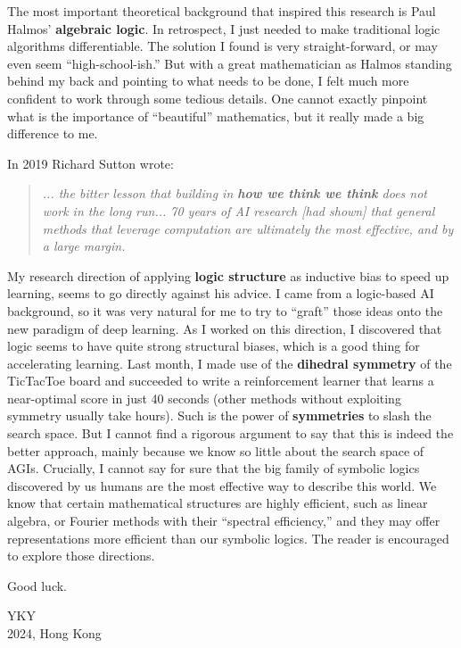 \begin{preface}
The most important theoretical background that inspired this research is Paul Halmos' \textbf{algebraic logic}.  In retrospect, I just needed to make traditional logic algorithms differentiable.  The solution I found is very straight-forward, or may even seem ``high-school-ish.''  But with a great mathematician as Halmos standing behind my back and pointing to what needs to be done, I felt much more confident to work through some tedious details.  One cannot exactly pinpoint what is the importance of ``beautiful'' mathematics, but it really made a big difference to me.

In 2019 Richard Sutton wrote:
\begin{quotation}
	\textit{... the bitter lesson that building in \textbf{how we think we think} does not work in the long run... 70 years of AI research [had shown] that general methods that leverage computation are ultimately the most effective, and by a large margin.}
\end{quotation}
My research direction of applying \textbf{logic structure} as inductive bias to speed up learning, seems to go directly against his advice.  I came from a logic-based AI background, so it was very natural for me to try to ``graft'' those ideas onto the new paradigm of deep learning.  As I worked on this direction, I discovered that logic seems to have quite strong structural biases, which is a good thing for accelerating learning.  Last month, I made use of the \textbf{dihedral symmetry} of the TicTacToe board and succeeded to write a reinforcement learner that learns a near-optimal score in just 40 seconds (other methods without exploiting symmetry usually take hours).  Such is the power of \textbf{symmetries} to slash the search space.  But I cannot find a rigorous argument to say that this is indeed the better approach, mainly because we know so little about the search space of AGIs.  Crucially, I cannot say for sure that the big family of symbolic logics discovered by us humans are the most effective way to describe this world.  We know that certain mathematical structures are highly efficient, such as linear algebra, or Fourier methods with their ``spectral efficiency,'' and they may offer representations more efficient than our symbolic logics.  The reader is encouraged to explore those directions.

Good luck.

\begin{flushright}
YKY\\
2024, Hong Kong
\end{flushright}

\end{preface}
